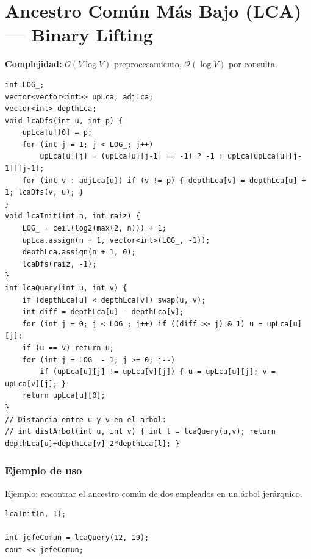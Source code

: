 \documentclass[10pt,twocolumn,letterpaper]{report}
\begin{document}
\section{Ancestro Común Más Bajo (LCA) --- Binary Lifting}
\textbf{Complejidad:} $\mathcal{O}(V \log V)$ preprocesamiento, $\mathcal{O}(\log V)$ por consulta.
\begin{lstlisting}
int LOG_;
vector<vector<int>> upLca, adjLca;
vector<int> depthLca;
void lcaDfs(int u, int p) {
    upLca[u][0] = p;
    for (int j = 1; j < LOG_; j++)
        upLca[u][j] = (upLca[u][j-1] == -1) ? -1 : upLca[upLca[u][j-1]][j-1];
    for (int v : adjLca[u]) if (v != p) { depthLca[v] = depthLca[u] + 1; lcaDfs(v, u); }
}
void lcaInit(int n, int raiz) {
    LOG_ = ceil(log2(max(2, n))) + 1;
    upLca.assign(n + 1, vector<int>(LOG_, -1));
    depthLca.assign(n + 1, 0);
    lcaDfs(raiz, -1);
}
int lcaQuery(int u, int v) {
    if (depthLca[u] < depthLca[v]) swap(u, v);
    int diff = depthLca[u] - depthLca[v];
    for (int j = 0; j < LOG_; j++) if ((diff >> j) & 1) u = upLca[u][j];
    if (u == v) return u;
    for (int j = LOG_ - 1; j >= 0; j--)
        if (upLca[u][j] != upLca[v][j]) { u = upLca[u][j]; v = upLca[v][j]; }
    return upLca[u][0];
}
// Distancia entre u y v en el arbol:
// int distArbol(int u, int v) { int l = lcaQuery(u,v); return depthLca[u]+depthLca[v]-2*depthLca[l]; }
\end{lstlisting}
\subsubsection*{Ejemplo de uso}
Ejemplo: encontrar el ancestro común de dos empleados en un árbol jerárquico.
\begin{lstlisting}
lcaInit(n, 1);

int jefeComun = lcaQuery(12, 19);
cout << jefeComun;
\end{lstlisting}


\end{document}
